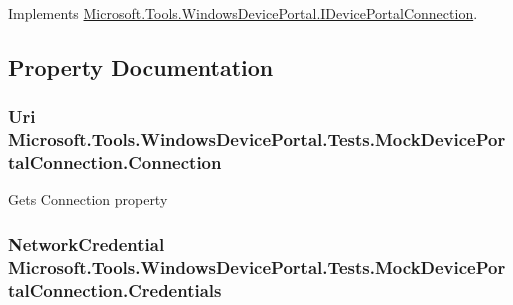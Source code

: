 Implements \hyperlink{interface_microsoft_1_1_tools_1_1_windows_device_portal_1_1_i_device_portal_connection_a70508473f17f95abd516afc31a080b0d}{Microsoft.\+Tools.\+Windows\+Device\+Portal.\+I\+Device\+Portal\+Connection}.



\subsection{Property Documentation}
\subsubsection[{\texorpdfstring{Connection}{Connection}}]{\setlength{\rightskip}{0pt plus 5cm}Uri Microsoft.\+Tools.\+Windows\+Device\+Portal.\+Tests.\+Mock\+Device\+Portal\+Connection.\+Connection\hspace{0.3cm}{\ttfamily [get]}}\hypertarget{class_microsoft_1_1_tools_1_1_windows_device_portal_1_1_tests_1_1_mock_device_portal_connection_ab7fad1f5afcc26074ee23bbdf8abf771}{}\label{class_microsoft_1_1_tools_1_1_windows_device_portal_1_1_tests_1_1_mock_device_portal_connection_ab7fad1f5afcc26074ee23bbdf8abf771}


Gets Connection property 

\subsubsection[{\texorpdfstring{Credentials}{Credentials}}]{\setlength{\rightskip}{0pt plus 5cm}Network\+Credential Microsoft.\+Tools.\+Windows\+Device\+Portal.\+Tests.\+Mock\+Device\+Portal\+Connection.\+Credentials\hspace{0.3cm}{\ttfamily [get]}}\hypertarget{class_microsoft_1_1_tools_1_1_windows_device_portal_1_1_tests_1_1_mock_device_portal_connection_a40e82e69d4cbbd84f3a71b61d77a90a4}{}\label{class_microsoft_1_1_tools_1_1_windows_device_portal_1_1_tests_1_1_mock_device_portal_connection_a40e82e69d4cbbd84f3a71b61d77a90a4}


